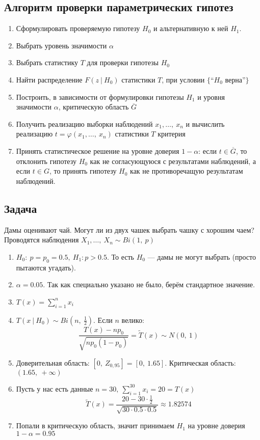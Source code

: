 \documentclass[12pt, a4paper]{article}
\newcommand{\sion}{\sum\limits_{i = 1}^{n}}
\begin{document}
\subsection*{Алгоритм проверки параметрических гипотез}
\begin{enumerate}
    \item Сформулировать проверяемую гипотезу $H_0$ и альтернативную к ней $H_1$.
    \item Выбрать уровень значимости $\alpha$
    \item Выбрать статистику $T$ для проверки гипотезы $H_0$
    \item Найти распределение $F(z\ |\ H_0)$ статистики $T$, при условии $\{\text{``$H_0$ верна''}\}$
    \item Построить, в зависимости от формулировки гипотезы $H_1$ и уровня значимости $\alpha$, критическую область $\overline{G}$
    \item Получить реализацию выборки наблюдений $x_1,\dots,\ x_n$ и вычислить реализацию $t = \varphi(x_1,\dots,\ x_n)$ статистики $T$ критерия
    \item Принять статистическое решение на уровне доверия $1 - \alpha$: если $t\in \overline{G}$, то отклонить гипотезу $H_0$ как не согласующуюся с результатами наблюдений, а если $t\in G$, то принять гипотезу $H_0$ как не противоречащую результатам наблюдений.
\end{enumerate}
\subsection*{Задача}
Дамы оценивают чай. Могут ли из двух чашек выбрать чашку с хорошим чаем?\\
Проводятся наблюдения $X_1,\dots,\ X_n \sim Bi(1,\ p)$
\begin{enumerate}
    \item $H_0:\ p = p_0 = 0.5,\ H_1: p > 0.5$. То есть $H_0$ --- дамы не могут выбрать (просто пытаются угадать).
    \item $\alpha = 0.05$. Так как специально указано не было, берём стандартное значение.
    \item $T(x) = \sion x_i$
    \item $T(x\ |\ H_0) \sim Bi(n,\ \frac{1}{2})$. Если $n$ велико:
    \[\frac{T(x) - np_0}{\sqrt{np_0 (1 - p_0)}} = \tilde T(x) \sim N(0,\ 1)\]
    \item Доверительная область: $[0,\ Z_{0,95}] = [0,\ 1.65]$. Критическая область: $(1.65,\ +\infty)$
    \item Пусть у нас есть данные $n = 30,\ \sum_{i = 1}^{30} x_i = 20 = T(x)$
    \[\tilde T(x) = \frac{20 - 30\cdot\frac{1}{2}}{\sqrt{30\cdot0.5\cdot 0.5}} \approx 1.82574\]
    \item Попали в критическую область, значит принимаем $H_1$ на уровне доверия $1 - \alpha = 0.95$
\end{enumerate}
\end{document}
